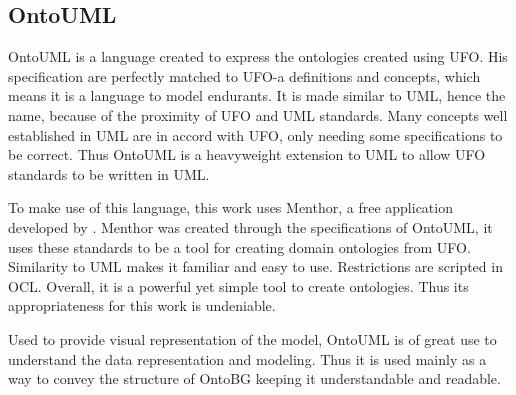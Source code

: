 \subsection{OntoUML}


OntoUML is a language created to express the ontologies created using UFO. His specification are perfectly matched to UFO-a definitions and concepts, which means it is a language to model endurants. It is made similar to UML, hence the name, because of the proximity of UFO and UML standards. Many concepts well established in UML are in accord with UFO, only needing some specifications to be correct. Thus OntoUML is a heavyweight extension to UML to allow UFO standards to be written in UML. 

To make use of this language, this work uses Menthor, a free application developed by \citeauthor{guizzardi_ontological_2005}. Menthor was created through the specifications of OntoUML, it uses these standards to be a tool for creating domain ontologies from UFO. Similarity to UML makes it familiar and easy to use. Restrictions are scripted in OCL. Overall, it is a powerful yet simple tool to create ontologies. Thus its appropriateness for this work is undeniable.

Used to provide visual representation of the model, OntoUML is of great use to understand the data representation and modeling. Thus it is used mainly as a way to convey the structure of OntoBG keeping it understandable and readable.